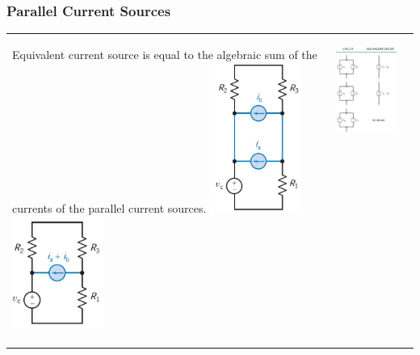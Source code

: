 \documentclass[aspectratio=169]{beamer}
\begin{document}
\begin{frame}[fragile]
	\frametitle{Parallel Current Sources}
		\begin{tabular}{ll}
			\begin{columns}
				\begin{column}{0.5\textwidth}  %
    					\begin{center}
						Equivalent current source is equal to the algebraic sum of the currents of the parallel current sources. 
     						\includegraphics[width=3cm]{figura16.JPG}\
						\includegraphics[width=3cm]{figura17.JPG}
     					\end{center}	
				\end{column}
				\begin{column}{0.5\textwidth}  %
					\begin{center}	
     						\includegraphics[width=4.5cm]{figura15.JPG}
					\end{center}				
				\end{column}
			\end{columns}
		\end{tabular}
\end{frame}
\end{document}
